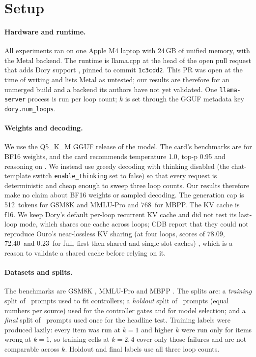\documentclass[11pt]{article}
\newcommand{\CapText}{512}
\newcommand{\CapCode}{768}
\newcommand{\LlamaRef}{\texttt{1c3cdd2}}
\newcommand{\MemGb}{24}
\newcommand{\CdbOuroFull}{78.09}%
\newcommand{\CdbOuroShared}{72.40}%
\newcommand{\CdbOuroSingle}{0.23}%
\begin{document}
\section{Setup}
\label{sec:setup}
\paragraph{Hardware and runtime.}
All experiments ran on one Apple M4 laptop with \MemGb\,GB of unified memory, with the Metal backend. The runtime is llama.cpp at the head of the open pull request that adds Dory support \citep{llamacpp30306}, pinned to commit \LlamaRef. This PR was open at the time of writing and lists Metal as untested; our results are therefore for an unmerged build and a backend its authors have not yet validated. One \texttt{llama-server} process is run per loop count; $k$ is set through the GGUF metadata key \texttt{dory.num\_loops}.

\paragraph{Weights and decoding.}
We use the Q5\_K\_M GGUF release of the model. The card's benchmarks are for BF16 weights, and the card recommends temperature 1.0, top-p 0.95 and reasoning on \citep{dorycard}. We instead use greedy decoding with thinking disabled (the chat-template switch \texttt{enable\_thinking} set to false) so that every request is deterministic and cheap enough to sweep three loop counts. Our results therefore make no claim about BF16 weights or sampled decoding. The generation cap is \CapText\ tokens for GSM8K and MMLU-Pro and \CapCode\ for MBPP. The KV cache is f16. We keep Dory's default per-loop recurrent KV cache and did not test its last-loop mode, which shares one cache across loops; CDB report that they could not reproduce Ouro's near-lossless KV sharing (at four loops, scores of \CdbOuroFull, \CdbOuroShared\ and \CdbOuroSingle\ for full, first-then-shared and single-slot caches) \citep[App.~E.1]{cdb2026}, which is a reason to validate a shared cache before relying on it.

\paragraph{Datasets and splits.}
The benchmarks are GSM8K \citep{gsm8k2021}, MMLU-Pro \citep{mmlupro2024} and MBPP \citep{mbpp2021}. The splits are: a \emph{training} split of \TrainN\ prompts used to fit controllers; a \emph{holdout} split of \HoldoutN\ prompts (equal numbers per source) used for the controller gates and for model selection; and a \emph{final} split of \FinalN\ prompts used once for the headline test. Training labels were produced lazily: every item was run at $k{=}1$ and higher $k$ were run only for items wrong at $k{=}1$, so training cells at $k{=}2,4$ cover only those failures and are not comparable across $k$. Holdout and final labels use all three loop counts.
\end{document}
